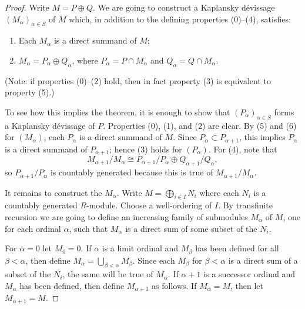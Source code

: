 \begin{proof}
Write $M=P\oplus Q$. We are going to construct a Kaplansky d\'evissage $(M_\alpha)_{\alpha\in S}$ of $M$ which, in addition to the defining properties (0)--(4), satisfies:
\begin{enumerate}[label=(\arabic*),start=5]
\item Each $M_\alpha$ is a direct summand of $M$;
\item $M_\alpha=P_\alpha\oplus Q_\alpha$, where $P_\alpha=P\cap M_\alpha$ and $Q_\alpha=Q\cap M_\alpha$.
\end{enumerate}
(Note: if properties (0)--(2) hold, then in fact property (3) is equivalent to property (5).)

To see how this implies the theorem, it is enough to show that $(P_\alpha)_{\alpha\in S}$ forms a Kaplansky d\'evissage of $P$. Properties (0), (1), and (2) are clear. By (5) and (6) for $(M_\alpha)$, each $P_\alpha$ is a direct summand of $M$. Since $P_\alpha\subset P_{\alpha+1}$, this implies $P_\alpha$ is a direct summand of $P_{\alpha+1}$; hence (3) holds for $(P_\alpha)$. For (4), note that
\[M_{\alpha+1}/M_\alpha\cong P_{\alpha+1}/P_\alpha\oplus Q_{\alpha+1}/Q_\alpha,\]
so $P_{\alpha+1}/P_\alpha$ is countably generated because this is true of $M_{\alpha+1}/M_\alpha$.

It remains to construct the $M_\alpha$. Write $M=\bigoplus_{i\in I}N_i$ where each $N_i$ is a countably generated $R$-module. Choose a well-ordering of $I$. By transfinite recursion we are going to define an increasing family of submodules $M_\alpha$ of $M$, one for each ordinal $\alpha$, such that $M_\alpha$ is a direct sum of some subset of the $N_i$.

For $\alpha=0$ let $M_0=0$. If $\alpha$ is a limit ordinal and $M_\beta$ has been defined for all $\beta<\alpha$, then define $M_\alpha=\bigcup_{\beta<\alpha}M_\beta$. Since each $M_\beta$ for $\beta<\alpha$ is a direct sum of a subset of the $N_i$, the same will be true of $M_\alpha$. If $\alpha+1$ is a successor ordinal and $M_\alpha$ has been defined, then define $M_{\alpha+1}$ as follows. If $M_\alpha=M$, then let $M_{\alpha+1}=M$.


\end{proof}
